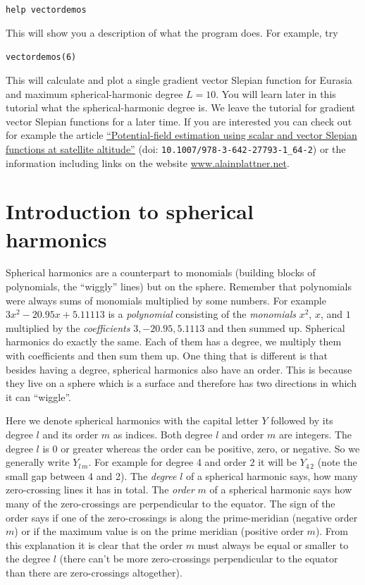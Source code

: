 \documentclass[11pt]{article}
\newcommand{\Yfun}{Y}
\begin{document}
\qquad \verb+help vectordemos+

This will show you a description of what the program does. For
example, try

\qquad \verb+vectordemos(6)+

This will calculate and plot a single gradient vector Slepian function
for Eurasia and maximum spherical-harmonic degree $L=10$. You will
learn later in this tutorial what the spherical-harmonic degree is.
We leave the tutorial for gradient vector Slepian functions for a
later time. If you are interested you can check out for example the
article
\href{https://doi.org/10.1007/978-3-642-27793-1_64-2}{``Potential-field
  estimation using scalar and vector Slepian functions at satellite
  altitude''} (doi: \verb+10.1007/978-3-642-27793-1_64-2+) or the information
including links on the website \url{www.alainplattner.net}.


\section{Introduction to spherical harmonics}

Spherical harmonics are a counterpart to monomials (building blocks of
polynomials, the ``wiggly'' lines) but on the sphere. Remember that
polynomials were always sums of monomials multiplied by some
numbers. For example $3x^2 - 20.95x + 5.11113$ is a \emph{polynomial}
consisting of the \emph{monomials} $x^2$, $x$, and $1$ multiplied by
the \emph{coefficients} $3, -20.95, 5.1113$ and then summed
up. Spherical harmonics do exactly the same. Each of them has a
degree, we multiply them with coefficients and then sum them up. One
thing that is different is that besides having a degree, spherical
harmonics also have an order. This is because they live on a sphere
which is a surface and therefore has two directions in which it can
``wiggle''.

Here we denote spherical harmonics with the capital letter $\Yfun$
followed by its degree $l$ and its order $m$ as indices. Both degree
$l$ and order $m$ are integers. The degree $l$ is 0 or greater whereas
the order can be positive, zero, or negative. So we generally write
$\Yfun_{l\,m}$. For example for degree 4 and order 2 it will be
$\Yfun_{4\,2}$ (note the small gap between 4 and 2). The \emph{degree}
$l$ of a spherical harmonic says, how many zero-crossing lines it has
in total. The \emph{order} $m$ of a spherical harmonic says how many
of the zero-crossings are perpendicular to the equator. The sign of
the order says if one of the zero-crossings is along the
prime-meridian (negative order $m$) or if the maximum value is on the
prime meridian (positive order $m$). From this explanation it is clear
that the order $m$ must always be equal or smaller to the degree $l$
(there can't be more zero-crossings perpendicular to the equator than
there are zero-crossings altogether).
\end{document}
